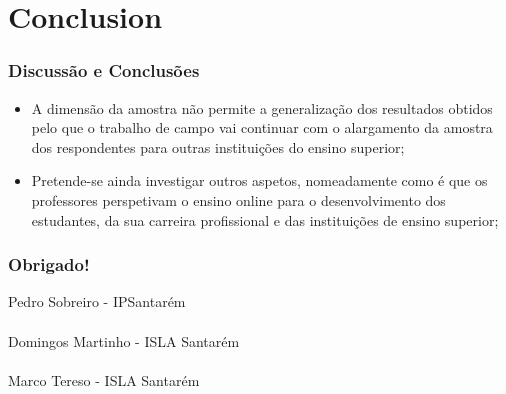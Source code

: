 \documentclass[10pt]{beamer}
\begin{document}
\section{Conclusion}
\begin{frame}
	\frametitle{Discussão e Conclusões}
	\begin{itemize}

 		\item A dimensão da amostra não permite a generalização dos resultados obtidos pelo que o trabalho de campo vai continuar com o alargamento da amostra dos respondentes para outras instituições do ensino superior;

		\item Pretende-se ainda investigar outros aspetos, nomeadamente como é que os professores perspetivam o ensino online para o desenvolvimento dos estudantes, da sua carreira profissional e das instituições de ensino superior;


	\end{itemize}
	\tiny 
\end{frame}


\begin{frame}
\frametitle{Obrigado!}
\normalsize
	Pedro Sobreiro - IPSantarém  \\~\\
	Domingos Martinho - ISLA Santarém \\~\\
	Marco Tereso - ISLA Santarém \\~\\
\end{frame}
\end{document}
